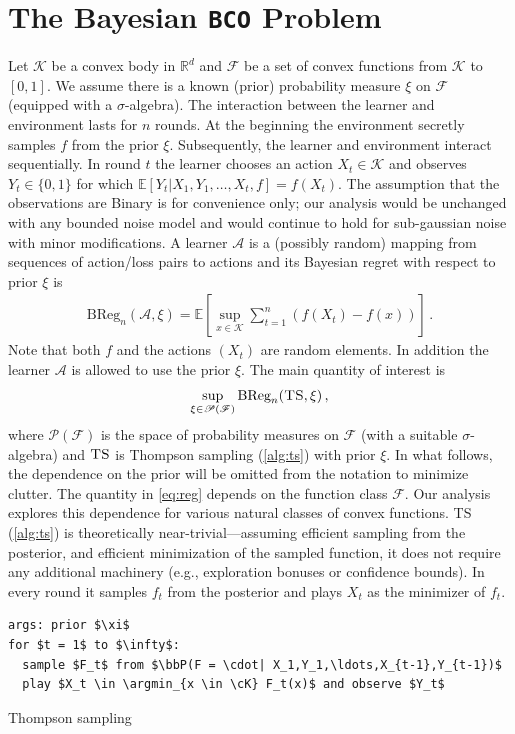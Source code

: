 \documentclass[letter, 12pt]{report}
\newcommand{\R}{\mathbb R}
\newcommand{\argmin}{\operatornamewithlimits{arg\,min}}
\newcommand{\BReg}{\textrm{BReg}}
\newcommand{\E}{\mathbb E}
\newcommand{\cK}{\mathcal K}
\newcommand{\sF}{\mathscr F}
\newcommand{\sA}{\mathscr A}
\newcommand{\sP}{\mathscr P}
\newcommand{\bbP}{\mathbb P}
\newcommand{\1}{\mathbf{1}}
\newcommand{\bco}{\texttt{BCO}\xspace}
\newcommand{\ts}{\textsc{TS}\xspace}
\theoremstyle{plain}
\theoremstyle{definition}
\theoremstyle{remark}
\begin{document}
\section{The Bayesian \bco Problem}
Let $\cK$ be a convex body in $\R^d$ and $\sF$ be a set of convex functions from $\cK$ to $[0,1]$.
We assume there is a known (prior) probability measure $\xi$ on $\sF$ (equipped with a $\sigma$-algebra).
The interaction between the learner and environment
lasts for $n$ rounds. At the beginning the environment secretly samples $f$ from the prior $\xi$.
Subsequently, the learner and environment interact sequentially. In round $t$ the learner chooses an action $X_t \in \cK$ and observes
$Y_t \in \{0, 1\}$ for which $\E[Y_t|X_1,Y_1,\ldots,X_t,f] = f(X_t)$.
The assumption that the observations are Binary is for convenience only; our analysis would be unchanged with any bounded noise model and would continue to hold
for sub-gaussian noise with minor modifications.
A learner $\sA$ is a (possibly random) mapping from sequences of action/loss pairs to actions and its Bayesian regret with respect to prior $\xi$ is
\begin{align*}
    \BReg_n(\sA, \xi) = \E\left[\sup_{x \in \cK} \sum_{t=1}^n \left(f(X_t) - f(x)\right)\right] \,.
\end{align*}
Note that both $f$ and the actions $(X_t)$ are random elements. In addition the learner $\sA$ is allowed to use the prior $\xi$.
The main quantity of interest is
\begin{align}
    \sup_{\xi \in \sP(\sF)} \BReg_n(\ts, \xi)\,,
    \label{eq:reg}
\end{align}
where $\sP(\sF)$ is the space of probability measures on $\sF$ (with a suitable $\sigma$-algebra) and $\ts$ is Thompson sampling (\cref{alg:ts})
with prior $\xi$. In what follows, the dependence on the prior will be omitted from the notation to minimize clutter.
The quantity in \cref{eq:reg} depends on the function class $\sF$. Our analysis explores this dependence for various natural classes of convex functions.
\ts{} (\cref{alg:ts}) is theoretically near-trivial---assuming efficient sampling from the posterior, and efficient minimization of the sampled function, it does not require any additional machinery (e.g., exploration bonuses or confidence bounds).
In every round it samples $f_t$ from the posterior and plays $X_t$ as the minimizer of $f_t$.
\begin{algorithm}[h!]
    \begin{minipage}{12cm}
        \begin{mdframed}
            \begin{lstlisting}
args: prior $\xi$
for $t = 1$ to $\infty$:
  sample $F_t$ from $\bbP(F = \cdot| X_1,Y_1,\ldots,X_{t-1},Y_{t-1})$
  play $X_t \in \argmin_{x \in \cK} F_t(x)$ and observe $Y_t$
\end{lstlisting}
            \caption{Thompson sampling}\label{alg:ts}
        \end{mdframed}
    \end{minipage}
\end{algorithm}
\end{document}
